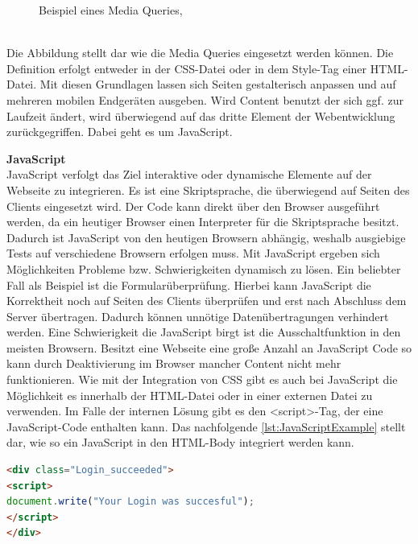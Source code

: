 \documentclass[a4paper,titlepage,halfparskip,12pt]{scrreprt}
\begin{document}
\begin{onehalfspacing}
\begin{figure}[h]
	\caption{Beispiel eines Media Queries, \cite{buhler2017html5}}
	\label{img:/MediaQbsp}
\end{figure}
\\Die Abbildung stellt dar wie die Media Queries eingesetzt werden können. Die Definition erfolgt entweder in der \ac{CSS}-Datei oder in dem Style-Tag einer \ac{HTML}-Datei. Mit diesen Grundlagen lassen sich Seiten gestalterisch anpassen und auf mehreren mobilen Endgeräten ausgeben. Wird Content benutzt der sich ggf. zur Laufzeit ändert, wird überwiegend auf das dritte Element der Webentwicklung zurückgegriffen. Dabei geht es um JavaScript.\cite{buhler2017html5}

\textbf{JavaScript}\\
JavaScript verfolgt das Ziel interaktive oder dynamische Elemente auf der Webseite zu integrieren. Es ist eine Skriptsprache, die überwiegend auf Seiten des Clients eingesetzt wird. Der Code kann direkt über den Browser ausgeführt werden, da ein heutiger Browser einen Interpreter für die Skriptsprache besitzt. Dadurch ist JavaScript von den heutigen Browsern abhängig, weshalb ausgiebige Tests auf verschiedene Browsern erfolgen muss. Mit JavaScript ergeben sich Möglichkeiten Probleme bzw. Schwierigkeiten dynamisch zu lösen. Ein beliebter Fall als Beispiel ist die Formularüberprüfung. Hierbei kann JavaScript die Korrektheit noch auf Seiten des Clients überprüfen und erst nach Abschluss dem Server übertragen. Dadurch können unnötige Datenübertragungen verhindert werden. Eine Schwierigkeit die JavaScript birgt ist die Ausschaltfunktion in den meisten Browsern. Besitzt eine Webseite eine große Anzahl an JavaScript Code so kann durch Deaktivierung im Browser mancher Content nicht mehr funktionieren. Wie mit der Integration von CSS gibt es auch bei JavaScript die Möglichkeit es innerhalb der HTML-Datei oder in einer externen Datei zu verwenden. Im Falle der internen Lösung gibt es den <script>-Tag, der eine JavaScript-Code enthalten kann. Das nachfolgende \autoref{lst:JavaScriptExample} stellt dar, wie so ein JavaScript in den HTML-Body integriert werden kann.
\begin{lstlisting}[language=HTML,caption=Example Listing of JavaScript-Code,label={lst:JavaScriptExample}]
<div class="Login_succeeded">
<script>
document.write("Your Login was succesful");
</script>
</div>
\end{lstlisting}

\end{onehalfspacing}
\end{document}
